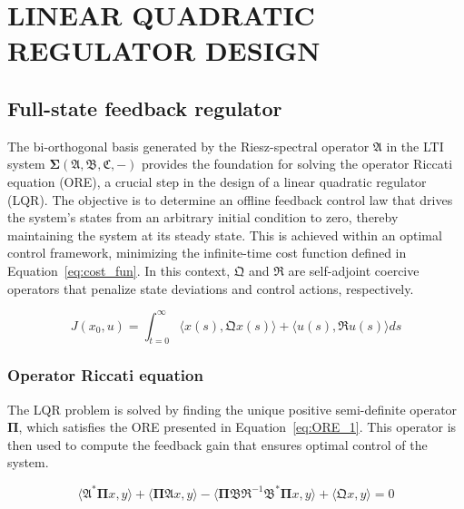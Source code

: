\section{LINEAR QUADRATIC REGULATOR DESIGN} \label{sec:control}

\subsection{Full-state feedback regulator} \label{sec:fullstate_design}

The bi-orthogonal basis generated by the Riesz-spectral operator $\mathfrak{A}$ in the LTI system $\mathbf{\Sigma(\mathfrak{A},\mathfrak{B},\mathfrak{C},-)}$ provides the foundation for solving the operator Riccati equation (ORE), a crucial step in the design of a linear quadratic regulator (LQR). The objective is to determine an offline feedback control law that drives the system's states from an arbitrary initial condition to zero, thereby maintaining the system at its steady state. This is achieved within an optimal control framework, minimizing the infinite-time cost function defined in Equation~\ref{eq:cost_fun}. In this context, $\mathfrak{Q}$ and $\mathfrak{R}$ are self-adjoint coercive operators that penalize state deviations and control actions, respectively.

\begin{equation} \label{eq:cost_fun}
    J({x_0}, u) = \int_{t=0}^{\infty} \langle {x}(s), \mathfrak{Q} {x}(s)\rangle + \langle u(s), \mathfrak{R} u(s)\rangle ds
\end{equation}

\subsubsection{Operator Riccati equation}

The LQR problem is solved by finding the unique positive semi-definite operator $\mathbf{\Pi}$, which satisfies the ORE presented in Equation~\ref{eq:ORE_1}. This operator is then used to compute the feedback gain that ensures optimal control of the system.

\begin{equation} \label{eq:ORE_1}
    \langle \mathfrak{A}^* \mathbf{\Pi} {x}, {y}\rangle + \langle \mathbf{\Pi} \mathfrak{A} {x}, {y} \rangle - \langle \mathbf{\Pi} \mathfrak{B} \mathfrak{R}^{-1} \mathfrak{B}^* \mathbf{\Pi} {x}, {y}\rangle + \langle \mathfrak{Q} {x}, {y}\rangle = 0
\end{equation}


